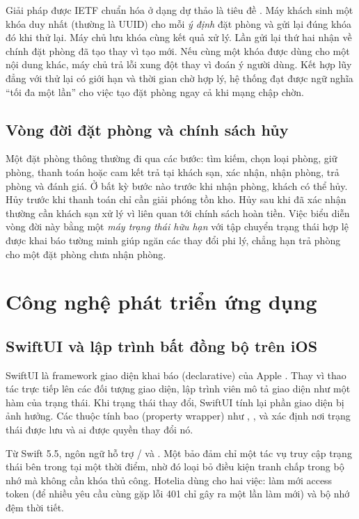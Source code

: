 Giải pháp được IETF chuẩn hóa ở dạng dự thảo là tiêu đề  \cite{idempotencykey}. Máy khách sinh một khóa duy nhất (thường là UUID) cho mỗi \emph{ý định} đặt phòng và gửi lại đúng khóa đó khi thử lại. Máy chủ lưu khóa cùng kết quả xử lý. Lần gửi lại thứ hai nhận về chính đặt phòng đã tạo thay vì tạo mới. Nếu cùng một khóa được dùng cho một nội dung khác, máy chủ trả lỗi xung đột thay vì đoán ý người dùng. Kết hợp lũy đẳng với thử lại có giới hạn và thời gian chờ hợp lý, hệ thống đạt được ngữ nghĩa ``tối đa một lần'' cho việc tạo đặt phòng ngay cả khi mạng chập chờn.

\subsection{Vòng đời đặt phòng và chính sách hủy}

Một đặt phòng thông thường đi qua các bước: tìm kiếm, chọn loại phòng, giữ phòng, thanh toán hoặc cam kết trả tại khách sạn, xác nhận, nhận phòng, trả phòng và đánh giá. Ở bất kỳ bước nào trước khi nhận phòng, khách có thể hủy. Hủy trước khi thanh toán chỉ cần giải phóng tồn kho. Hủy sau khi đã xác nhận thường cần khách sạn xử lý vì liên quan tới chính sách hoàn tiền. Việc biểu diễn vòng đời này bằng một \emph{máy trạng thái hữu hạn} với tập chuyển trạng thái hợp lệ được khai báo tường minh giúp ngăn các thay đổi phi lý, chẳng hạn trả phòng cho một đặt phòng chưa nhận phòng.

\section{Công nghệ phát triển ứng dụng}\label{sec:tech}

\subsection{SwiftUI và lập trình bất đồng bộ trên iOS}

SwiftUI là framework giao diện khai báo (declarative) của Apple \cite{swiftui}. Thay vì thao tác trực tiếp lên các đối tượng giao diện, lập trình viên mô tả giao diện như một hàm của trạng thái. Khi trạng thái thay đổi, SwiftUI tính lại phần giao diện bị ảnh hưởng. Các thuộc tính bao (property wrapper) như , ,  và  xác định nơi trạng thái được lưu và ai được quyền thay đổi nó.

Từ Swift 5.5, ngôn ngữ hỗ trợ / và  \cite{swiftconcurrency}. Một  bảo đảm chỉ một tác vụ truy cập trạng thái bên trong tại một thời điểm, nhờ đó loại bỏ điều kiện tranh chấp trong bộ nhớ mà không cần khóa thủ công. Hotelia dùng  cho hai việc: làm mới access token (để nhiều yêu cầu cùng gặp lỗi 401 chỉ gây ra một lần làm mới) và bộ nhớ đệm thời tiết.

